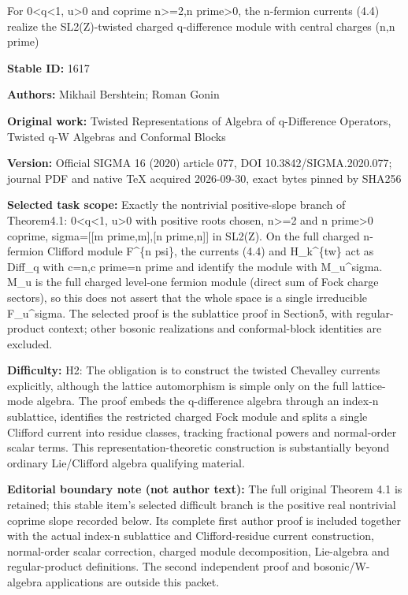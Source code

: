 \documentclass[11pt]{article}
\numberwithin{equation}{section}
\theoremstyle{definition}
\begin{document}
\begin{center}\Large For 0<q<1, u>0 and coprime n>=2,n prime>0, the n-fermion currents (4.4) realize the SL2(Z)-twisted charged q-difference module with central charges (n,n prime)\end{center}
\noindent\textbf{Stable ID:} 1617\par
\noindent\textbf{Authors:} Mikhail Bershtein; Roman Gonin\par
\noindent\textbf{Original work:} Twisted Representations of Algebra of q-Difference Operators, Twisted q-W Algebras and Conformal Blocks\par
\noindent\textbf{Version:} Official SIGMA 16 (2020) article 077, DOI 10.3842/SIGMA.2020.077; journal PDF and native TeX acquired 2026-09-30, exact bytes pinned by SHA256\par
\noindent\textbf{Selected task scope:} Exactly the nontrivial positive-slope branch of Theorem4.1: 0<q<1, u>0 with positive roots chosen, n>=2 and n prime>0 coprime, sigma=[[m prime,m],[n prime,n]] in SL2(Z). On the full charged n-fermion Clifford module F\textasciicircum{}\{n psi\}, the currents (4.4) and H\_k\textasciicircum{}\{tw\} act as Diff\_q with c=n,c prime=n prime and identify the module with M\_u\textasciicircum{}sigma. M\_u is the full charged level-one fermion module (direct sum of Fock charge sectors), so this does not assert that the whole space is a single irreducible F\_u\textasciicircum{}sigma. The selected proof is the sublattice proof in Section5, with regular-product context; other bosonic realizations and conformal-block identities are excluded.\par
\noindent\textbf{Difficulty:} H2: The obligation is to construct the twisted Chevalley currents explicitly, although the lattice automorphism is simple only on the full lattice-mode algebra. The proof embeds the q-difference algebra through an index-n sublattice, identifies the restricted charged Fock module and splits a single Clifford current into residue classes, tracking fractional powers and normal-order scalar terms. This representation-theoretic construction is substantially beyond ordinary Lie/Clifford algebra qualifying material.\par
\noindent\textbf{Editorial boundary note (not author text):} The full original Theorem 4.1 is retained; this stable item's selected difficult branch is the positive real nontrivial coprime slope recorded below. Its complete first author proof is included together with the actual index-n sublattice and Clifford-residue current construction, normal-order scalar correction, charged module decomposition, Lie-algebra and regular-product definitions. The second independent proof and bosonic/W-algebra applications are outside this packet.\par
\end{document}
